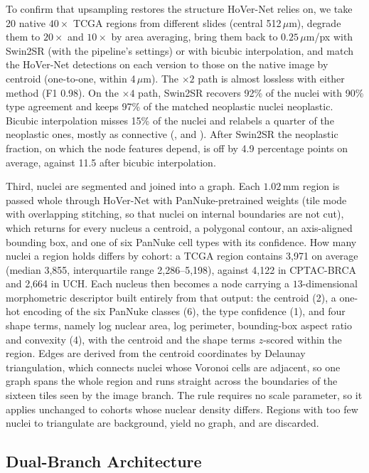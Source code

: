 \documentclass{midl} %
\begin{document}
To confirm that upsampling restores the structure HoVer-Net relies on, we take 20 native
$40\times$ TCGA regions from different slides (central 512\,$\mu$m), degrade them to $20\times$
and $10\times$ by area averaging, bring them back to $0.25\,\mu$m/px with Swin2SR (with the
pipeline's settings) or with bicubic interpolation, and match the HoVer-Net detections on each
version to those on the native image by centroid (one-to-one, within 4\,$\mu$m). The $\times 2$
path is almost lossless with either method (F1 0.98). On the $\times 4$ path, Swin2SR recovers
92\% of the nuclei with 90\% type agreement and keeps 97\% of the matched neoplastic nuclei
neoplastic. Bicubic interpolation misses 15\% of the nuclei and relabels a quarter of the
neoplastic ones, mostly as connective (,  and ).
After Swin2SR the neoplastic fraction, on which the node features depend, is off by 4.9
percentage points on average, against 11.5 after bicubic interpolation.

Third, nuclei are segmented and joined into a graph. Each $1.02$\,mm region is passed whole
through HoVer-Net \citep{graham2019} with PanNuke-pretrained weights (tile mode with
overlapping stitching, so that nuclei on internal boundaries are not cut), which returns for
every nucleus a centroid, a polygonal contour, an axis-aligned bounding box, and one of six
PanNuke cell types with its confidence. How many nuclei a region holds differs by cohort: a
TCGA region contains 3,971 on average (median 3,855, interquartile range 2,286--5,198), against
4,122 in CPTAC-BRCA and 2,664 in UCH. Each nucleus then becomes a node carrying a
$13$-dimensional morphometric descriptor built entirely from that output: the centroid (2), a
one-hot encoding of the six PanNuke classes (6), the type confidence (1), and four shape terms,
namely log nuclear area, log perimeter, bounding-box aspect ratio and convexity (4), with the
centroid and the shape terms $z$-scored within the region. Edges are derived from the centroid
coordinates by Delaunay triangulation, which connects nuclei whose Voronoi cells are adjacent,
so one graph spans the whole region and runs straight across the boundaries of the sixteen
tiles seen by the image branch. The rule requires no scale parameter, so it applies unchanged
to cohorts whose nuclear density differs. Regions with too few nuclei to triangulate are
background, yield no graph, and are discarded.

\subsection{Dual-Branch Architecture}
\label{sec:dual-branch-architecture}
\end{document}
